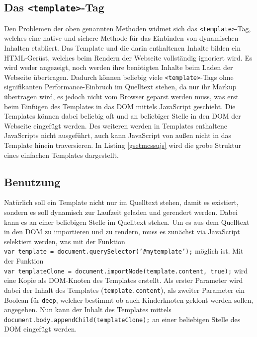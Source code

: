 \subsection{Das \texorpdfstring{\texttt{\textless{}template\textgreater{}}-Tag}{\textless{}template\textgreater{}-Tag}}\label{template-tag}

Den Problemen der oben genannten Methoden widmet sich das \texttt{\textless{}template\textgreater{}}-Tag, welches eine native und sichere Methode für das Einbinden von dynamischen Inhalten etabliert. Das Template und die darin enthaltenen Inhalte bilden ein \ac{HTML}-Gerüst, welches beim Rendern der Webseite vollständig ignoriert wird. Es wird weder angezeigt, noch werden ihre benötigten Inhalte beim Laden der Webseite übertragen. Dadurch können beliebig viele \texttt{\textless{}template\textgreater{}}-Tags ohne signifikanten Performance-Einbruch im Quelltext stehen, da nur ihr Markup übertragen wird, es jedoch nicht vom Browser geparst werden muss, was erst beim Einfügen des Templates in das \ac{DOM} mittels JavaScript geschieht. Die Templates können dabei beliebig oft und an beliebiger Stelle in den \ac{DOM} der Webseite eingefügt werden. Des weiteren werden in Templates enthaltene JavaScripts nicht ausgeführt, auch kann JavaScript von außen nicht in das Template hinein traversieren. In Listing \ref{gsetmcssujs} wird die grobe Struktur eines einfachen Templates dargestellt.




\subsection{Benutzung}\label{benutzung}

Natürlich soll ein Template nicht nur im Quelltext stehen, damit es existiert, sondern es soll dynamisch zur Laufzeit geladen und gerendert werden. Dabei kann es an einer beliebigen Stelle im Quelltext stehen. Um es aus dem Quelltext in den \ac{DOM} zu importieren und zu rendern, muss es zunächst via JavaScript selektiert werden, was mit der Funktion \texttt{var\ template\ =\ document.querySelector('\#mytemplate');} möglich ist. Mit der Funktion \texttt{var\ templateClone\ =\ document.importNode(template.content,\ true);} wird eine Kopie als \ac{DOM}-Knoten des Templates erstellt. Als erster Parameter wird dabei der Inhalt des Templates (\texttt{template.content}), als zweiter Parameter ein Boolean für \texttt{deep}, welcher bestimmt ob auch Kinderknoten geklont werden sollen, angegeben. Nun kann der Inhalt des Templates mittels \texttt{document.body.appendChild(templateClone);} an einer beliebigen Stelle des \ac{DOM} eingefügt werden.


